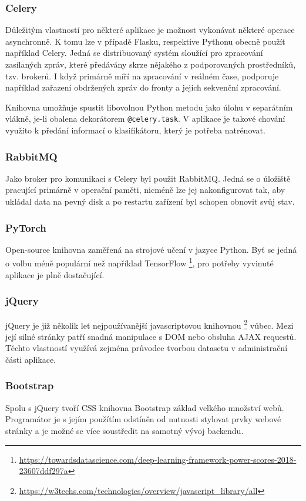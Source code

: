 \documentclass[
  field=ainfp,
  master=true,
  biblatex,
  sourcecodes=false,
  theorems=false,
  glossaries,
  index
]{kidiplom}
\begin{document}
\subsubsection*{Celery}
Důležitým vlastností pro některé aplikace je možnost vykonávat některé operace asynchronně. K tomu lze v případě Flasku, respektive Pythonu obecně použít například Celery. Jedná se distribuovaný systém sloužící pro zpracování zasílaných zpráv, které předávány skrze nějakého z podporovaných prostředníků, tzv. brokerů. I když primárně míří na zpracování v reálném čase, podporuje například zařazení obdržených zpráv do fronty a jejich sekvenční zpracování.

Knihovna umožňuje spustit libovolnou Python metodu jako úlohu v separátním vlákně, je-li obalena dekorátorem \texttt{@celery.task}. V aplikace je takové chování využito k předání informací o klasifikátoru, který je potřeba natrénovat.

\subsubsection*{RabbitMQ}
Jako broker pro komunikaci s Celery byl použit RabbitMQ. Jedná se o úložiště pracující primárně v operační paměti, nicméně lze jej nakonfigurovat tak, aby ukládal data na pevný disk a po restartu zařízení byl schopen obnovit svůj stav.

\subsubsection*{PyTorch}
Open-source knihovna zaměřená na strojové učení v jazyce Python. Byť se jedná o volbu méně populární než například TensorFlow \footnote{\url{https://towardsdatascience.com/deep-learning-framework-power-scores-2018-23607ddf297a}}, pro potřeby vyvinuté aplikace je plně dostačující.


\subsubsection*{jQuery}
jQuery je již několik let nejpoužívanější javascriptovou knihovnou \footnote{\url{https://w3techs.com/technologies/overview/javascript\_library/all}} vůbec. Mezi její silné stránky patří snadná manipulace s DOM nebo obsluha AJAX requestů. Těchto vlastností využívá zejména průvodce tvorbou datasetu v administrační části aplikace.

\subsubsection*{Bootstrap}
Spolu s jQuery tvoří CSS knihovna Bootstrap základ velkého množství webů. Programátor je s jejím použítím odstíněn od nutnosti stylovat prvky webové stránky a je možné se více soustředit na samotný vývoj backendu.
\end{document}
